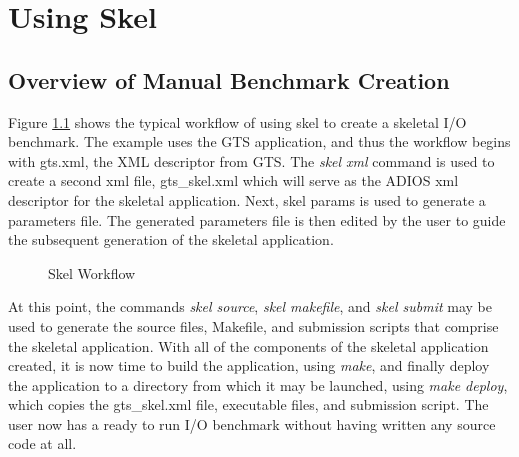 \chapter{Using Skel}
\section{Overview of Manual Benchmark Creation}
Figure \ref{fig:overview}  shows the typical workflow of using skel to create a skeletal I/O 
benchmark. The example uses the GTS application, and thus the workflow begins
with gts.xml, the XML descriptor from GTS. The {\it skel xml} command is used
to create a second xml file, gts\_skel.xml which will serve as the ADIOS xml
descriptor for the skeletal application. Next, skel params is used to generate
a parameters file. The generated parameters file is then edited by the user to
guide the subsequent generation of the skeletal application.

\begin{figure}[htb]
  \caption{\label{fig:overview} Skel Workflow}
\end{figure}


At this point, the commands {\it skel source}, {\it skel makefile}, and {\it skel submit}
may be used to generate the source files, Makefile, and submission scripts that
comprise the skeletal application. With all of the components of the skeletal
application created, it is now time to build the application, using {\it make}, and
finally deploy the application to a directory from which it may be launched,
using {\it make deploy}, which copies the gts\_skel.xml file, executable files, and
submission script. The user now has a ready to run I/O benchmark without
having written any source code at all.



